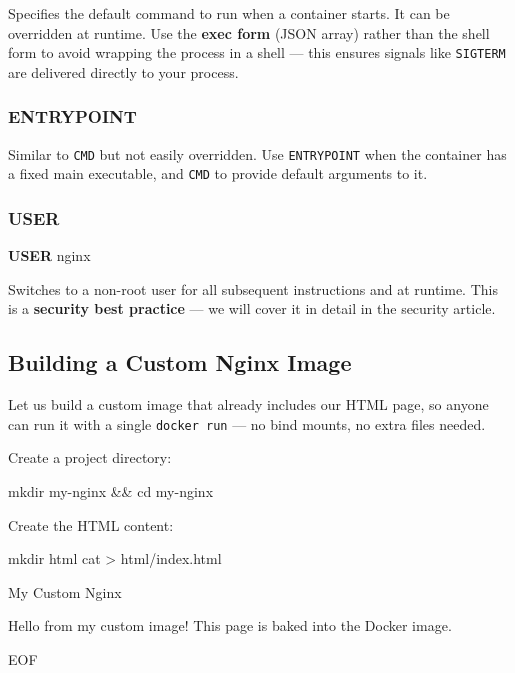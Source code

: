 \documentclass[11pt,american,a4paper,openany]{book}
\newenvironment{Shaded}{}{}
\newcommand{\KeywordTok}[1]{\textcolor[rgb]{0.00,0.44,0.13}{\textbf{#1}}}
\newcommand{\NormalTok}[1]{#1}
\begin{document}
Specifies the default command to run when a container starts. It can be
overridden at runtime. Use the \textbf{exec form} (JSON array) rather
than the shell form to avoid wrapping the process in a shell --- this
ensures signals like \texttt{SIGTERM} are delivered directly to your
process.

\subsubsection{ENTRYPOINT}\label{entrypoint}

Similar to \texttt{CMD} but not easily overridden. Use
\texttt{ENTRYPOINT} when the container has a fixed main executable, and
\texttt{CMD} to provide default arguments to it.

\subsubsection{USER}\label{user}

\begin{Shaded}
\begin{Highlighting}[]
\KeywordTok{USER}\NormalTok{ nginx}
\end{Highlighting}
\end{Shaded}

Switches to a non-root user for all subsequent instructions and at
runtime. This is a \textbf{security best practice} --- we will cover it
in detail in the security article.

\subsection{Building a Custom Nginx
Image}\label{building-a-custom-nginx-image}

Let us build a custom image that already includes our HTML page, so
anyone can run it with a single \texttt{docker\ run} --- no bind mounts,
no extra files needed.

Create a project directory:

\begin{Shaded}
\begin{Highlighting}[]
\NormalTok{mkdir my{-}nginx \&\& cd my{-}nginx}
\end{Highlighting}
\end{Shaded}

Create the HTML content:

\begin{Shaded}
\begin{Highlighting}[]
\NormalTok{mkdir html}
\NormalTok{cat \textgreater{} html/index.html }

\NormalTok{  My Custom Nginx}
  
\NormalTok{    Hello from my custom image!}
\NormalTok{    This page is baked into the Docker image.}
  

\NormalTok{EOF}
\end{Highlighting}
\end{Shaded}
\end{document}
